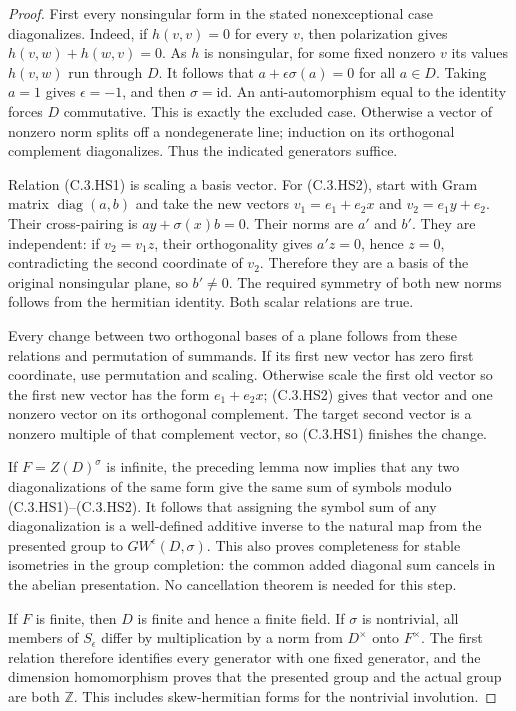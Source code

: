 \begin{proof}
First every nonsingular form in the stated nonexceptional case
diagonalizes. Indeed, if $h(v,v)=0$ for every $v$, then polarization
gives $h(v,w)+h(w,v)=0$. As $h$ is nonsingular, for some fixed
nonzero $v$ its values $h(v,w)$ run through $D$.
It follows that $a+\epsilon\sigma(a)=0$ for all $a\in D$.
Taking $a=1$ gives $\epsilon=-1$, and then $\sigma=\mathrm{id}$.
An anti-automorphism equal to the identity forces $D$ commutative.
This is exactly the excluded case. Otherwise a vector of nonzero
norm splits off a nondegenerate line; induction on its orthogonal
complement diagonalizes. Thus the indicated generators suffice.

Relation (C.3.HS1) is scaling a basis vector.
For (C.3.HS2), start with Gram matrix $\operatorname{diag}(a,b)$
and take the new vectors $v_1=e_1+e_2x$ and $v_2=e_1y+e_2$.
Their cross-pairing is $ay+\sigma(x)b=0$.
Their norms are $a'$ and $b'$.
They are independent: if $v_2=v_1z$, their orthogonality gives
$a'z=0$, hence $z=0$, contradicting the second coordinate of $v_2$.
Therefore they are a basis of the original nonsingular plane,
so $b'\ne0$. The required symmetry of both new norms follows
from the hermitian identity. Both scalar relations are true.

Every change between two orthogonal bases of a plane follows
from these relations and permutation of summands. If its first
new vector has zero first coordinate, use permutation and scaling.
Otherwise scale the first old vector so the first new vector
has the form $e_1+e_2x$; (C.3.HS2) gives that vector and one
nonzero vector on its orthogonal complement. The target second
vector is a nonzero multiple of that complement vector, so
(C.3.HS1) finishes the change.

If $F=Z(D)^\sigma$ is infinite, the preceding lemma now implies
that any two diagonalizations of the same form give the same
sum of symbols modulo (C.3.HS1)--(C.3.HS2).
It follows that assigning the symbol sum of any diagonalization
is a well-defined additive inverse to the natural map from the
presented group to $GW^\epsilon(D,\sigma)$.
This also proves completeness for stable isometries in the group
completion: the common added diagonal sum cancels in the abelian
presentation. No cancellation theorem is needed for this step.

If $F$ is finite, then $D$ is finite and hence a finite field.
If $\sigma$ is nontrivial, all members of $S_\epsilon$ differ
by multiplication by a norm from $D^\times$ onto $F^\times$.
The first relation therefore identifies every generator with
one fixed generator, and the dimension homomorphism proves
that the presented group and the actual group are both $\mathbb Z$.
This includes skew-hermitian forms for the nontrivial involution.


\end{proof}

